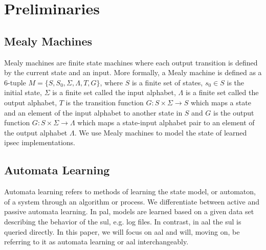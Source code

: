%
%
% 
% 
% 

\chapter{Preliminaries}

\label{chap:Preliminaries}

\section{Mealy Machines}
Mealy machines are finite state machines where each output transition is defined by the current state and an input. More formally, a Mealy machine is defined as a 6-tuple $M = \{S, S_0, \Sigma, \Lambda, T, G\}$, where $S$ is a finite set of states, $s_0 \in S$ is the initial state, $\Sigma$ is a finite set called the input alphabet, $\Lambda$ is a finite set called the output alphabet, $T$ is the transition function $G: S \times \Sigma \rightarrow S$ which maps a state and an element of the input alphabet to another state in $S$ and $G$ is the output function $G: S \times \Sigma \rightarrow \Lambda$ which maps a state-input alphabet pair to an element of the output alphabet $\Lambda$. We use Mealy machines to model the state of learned \ac{ipsec} implementations.

\section{Automata Learning}

Automata learning refers to methods of learning the state model, or automaton, of a system through an algorithm or process. We differentiate between active and passive automata learning. In \ac{pal}, models are learned based on a given data set describing the behavior of the \ac{sul}, e.g. log files. In contrast, in \ac{aal} the \ac{sul} is queried directly. In this paper, we will focus on \ac{aal} and will, moving on, be referring to it as automata learning or \ac{aal} interchangeably. 

